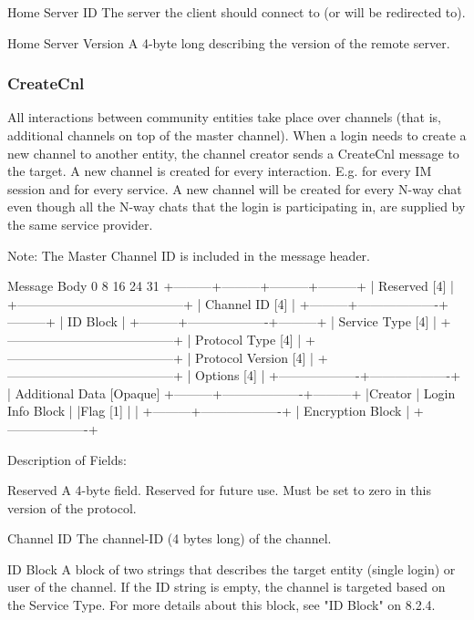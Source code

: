 \documentclass[titlepage,oneside]{book}
\begin{document}
Home Server ID
  The server the client should connect to (or will be redirected to).

Home Server Version
  A 4-byte long describing the version of the remote server.

\subsubsection{CreateCnl}

All interactions between community entities take place over channels
(that is, additional channels on top of the master channel). When a
login needs to create a new channel to another entity, the channel
creator sends a CreateCnl message to the target. A new channel is
created for every interaction. E.g. for every IM session and for every
service. A new channel will be created for every N-way chat even though
all the N-way chats that the login is participating in, are supplied by
the same service provider.

Note: The Master Channel ID is included in the message header.

Message Body
0         8         16        24      31
+---------+---------+---------+---------+
|               Reserved [4]            |
+---------------------------------------+
|              Channel ID [4]           |
+---------+-------------------+---------+
          |      ID Block     |
+---------+-------------------+---------+
|            Service Type [4]           |
+---------------------------------------+
|           Protocol Type [4]           |
+---------------------------------------+
|          Protocol Version [4]         |
+---------------------------------------+
|               Options [4]             |
+-------------------+-------------------+
| Additional Data [Opaque]
+---------+-------------------+---------+
|Creator  | Login Info Block  |
|Flag [1] |                   |
+---------+-------------------+
          |  Encryption Block |
          +-------------------+

Description of Fields:

Reserved
  A 4-byte field. Reserved for future use. Must be set to zero in this
  version of the protocol.

Channel ID
  The channel-ID (4 bytes long) of the channel.

ID Block
  A block of two strings that describes the target entity (single
  login) or user of the channel. If the ID string is empty, the channel
  is targeted based on the Service Type. For more details about this
  block, see "ID Block" on 8.2.4.
\end{document}
